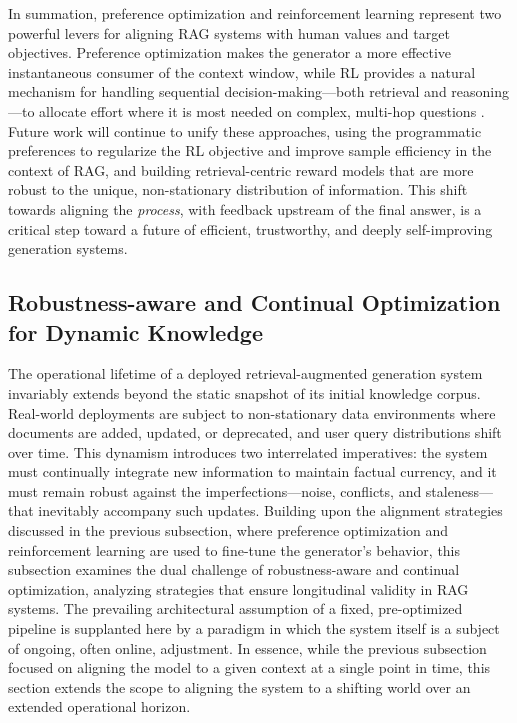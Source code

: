 \documentclass[11pt,a4paper]{article}
\begin{document}
In summation, preference optimization and reinforcement learning represent two powerful levers for aligning RAG systems with human values and target objectives. Preference optimization makes the generator a more effective instantaneous consumer of the context window, while RL provides a natural mechanism for handling sequential decision-making---both retrieval and reasoning---to allocate effort where it is most needed on complex, multi-hop questions \cite{arxiv:2510.12323v1}. Future work will continue to unify these approaches, using the programmatic preferences to regularize the RL objective and improve sample efficiency in the context of RAG, and building retrieval-centric reward models that are more robust to the unique, non-stationary distribution of information. This shift towards aligning the \emph{process}, with feedback upstream of the final answer, is a critical step toward a future of efficient, trustworthy, and deeply self-improving generation systems.


\subsection{Robustness-aware and Continual Optimization for Dynamic Knowledge}


The operational lifetime of a deployed retrieval-augmented generation system invariably extends beyond the static snapshot of its initial knowledge corpus. Real-world deployments are subject to non-stationary data environments where documents are added, updated, or deprecated, and user query distributions shift over time. This dynamism introduces two interrelated imperatives: the system must continually integrate new information to maintain factual currency, and it must remain robust against the imperfections---noise, conflicts, and staleness---that inevitably accompany such updates. Building upon the alignment strategies discussed in the previous subsection, where preference optimization and reinforcement learning are used to fine-tune the generator's behavior, this subsection examines the dual challenge of robustness-aware and continual optimization, analyzing strategies that ensure longitudinal validity in RAG systems. The prevailing architectural assumption of a fixed, pre-optimized pipeline is supplanted here by a paradigm in which the system itself is a subject of ongoing, often online, adjustment. In essence, while the previous subsection focused on aligning the model to a given context at a single point in time, this section extends the scope to aligning the system to a shifting world over an extended operational horizon.
\end{document}
